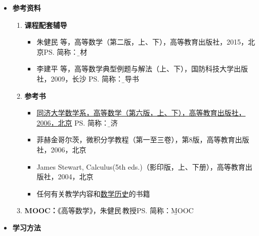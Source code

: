 \begin{itemize}
	\item {\bf 参考资料}
  	\begin{enumerate}
		\item {\bf 课程配套辅导}
	  	\begin{itemize}
	  	  \item 朱健民 等，高等数学（第二版，上、下），高等教育出版社，2015，北京\ps{简称：\b 教材} 
	    	\item {李建平 等，高等数学典型例题与解法（上、下），国防科技大学出版社，2009，长沙}
	    	\ps{简称：\b 辅导书} 
	  	\end{itemize}
  		\item {\bf 参考书} 
  		\begin{itemize}
	    	\item \underline{同济大学数学系，高等数学（第六版，上、下），高等教育出版社，2006，北京}
	    	\ps{简称：\b 同济}  
	    	\item 菲赫金哥尔茨，微积分学教程（第一至三卷），第8版，高等教育出版社，2006，北京 
	    	\item James Stewart, Calculus(5th eds.)（影印版，上、下册），高等教育出版社，2004，北京
	    	\item 任何有关教学内容和\underline{数学历史}的书籍
  		\end{itemize}
  		\item {\bf MOOC：}《高等数学》，朱健民\,教授\ps{简称：\b MOOC} 
	\end{enumerate}
	\item {\bf 学习方法}

\end{itemize}
